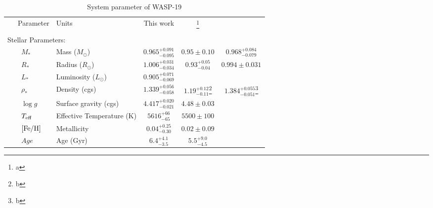 \begin{landscape}
\begin{longtable}{llccc}
\caption{System parameter of WASP-19}
\label{tab:wasp19}
\centering
\tabularnewline
\hline 
~~~Parameter & Units & This work & \cite{Hebb2010}\footnote{a} & \cite{Lendl2013}\\
\hline
\smallskip\\\multicolumn{2}{l}{Stellar Parameters:}&\smallskip\\
~~~~$M_*$\dotfill &Mass (\(M_\odot\))\dotfill &$0.965^{+0.091}_{-0.095}$ & $0.95\pm0.10$ & $0.968^{+0.084}_{-0.079}$ \\
~~~~$R_*$\dotfill &Radius (\(R_\odot\))\dotfill &$1.006^{+0.031}_{-0.034}$ & $0.93^{+0.05}_{-0.04}$& $0.994\pm0.031$\\
~~~~$L_*$\dotfill &Luminosity (\(L_\odot\))\dotfill &$0.905^{+0.071}_{-0.069}$\\
~~~~$\rho_*$\dotfill &Density (cgs)\dotfill &$1.339^{+0.056}_{-0.058}$ & $1.19^{+0.12}_{-0.11}$\footnote{b}  & $1.384^{+0.055}_{-0.051}$\footnote{b}\\
~~~~$\log{g}$\dotfill &Surface gravity (cgs)\dotfill &$4.417^{+0.020}_{-0.021}$ & $4.48\pm0.03$\\
~~~~$T_{\rm eff}$\dotfill &Effective Temperature (K)\dotfill &$5616^{+66}_{-65}$ & $5500\pm100$\\
~~~~$[{\rm Fe/H}]$\dotfill &Metallicity \dotfill &$0.04^{+0.25}_{-0.30}$ & $0.02\pm0.09$\\
~~~~$Age$\dotfill &Age (Gyr)\dotfill &$6.4^{+4.1}_{-3.5}$ & $5.5^{+9.0}_{-4.5}$\\


\end{longtable}
\end{landscape}
